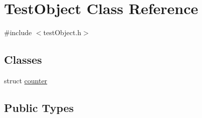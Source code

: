 \hypertarget{class_test_object}{}\section{Test\+Object Class Reference}
\label{class_test_object}


{\ttfamily \#include $<$test\+Object.\+h$>$}

\subsection*{Classes}
\begin{DoxyCompactItemize}
\item 
struct \hyperlink{struct_test_object_1_1counter}{counter}
\end{DoxyCompactItemize}
\subsection*{Public Types}
